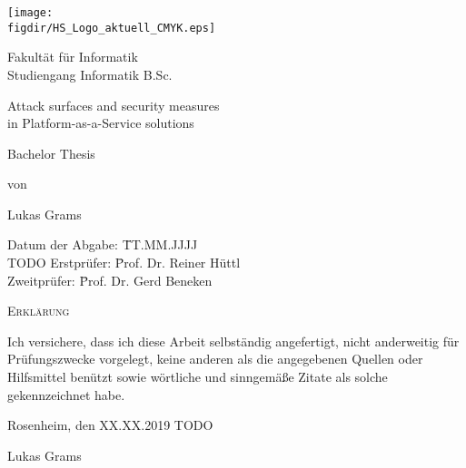 \begin{titlepage}

\sffamily

\raggedleft

\vspace*{-2cm}

\texttt{[image: \\figdir/HS\_Logo\_aktuell\_CMYK.eps]}

\vfill

\centering
\Huge
Fakultät für Informatik  \vspace{0.5cm}\\
\Large
Studiengang Informatik B.Sc.

\Huge
Attack surfaces and security measures \\
in Platform-as-a-Service solutions

\vspace{2cm}

\Large
Bachelor Thesis


\vspace{1.5cm}

\Large
von

\vspace{0.5cm}

\LARGE
Lukas Grams

\vspace{1cm}

\flushleft
 \Large
\vspace*{\fill}

\begin{tabbing}
Datum der Abgabe: \= TT.MM.JJJJ \\ TODO
Erstprüfer: \= Prof. Dr. Reiner Hüttl \\
Zweitprüfer: \= Prof. Dr. Gerd Beneken \\
\end{tabbing}

\end{titlepage}


\cleardoubleemptypage

{
\large
\thispagestyle{empty}
\vspace*{\fill}

\noindent
\textsc{Erklärung}

\medskip

\noindent
Ich versichere, dass ich diese Arbeit selbständig
angefertigt, nicht anderweitig für Prüfungszwecke
vorgelegt, keine anderen als die angegebenen Quellen
oder Hilfsmittel benützt sowie wörtliche und
sinngemäße Zitate als solche gekennzeichnet habe.

\bigskip

\noindent
Rosenheim, den XX.XX.2019 TODO

\vspace*{2cm}

\noindent
Lukas Grams
}